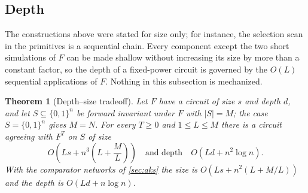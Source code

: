 \documentclass[11pt]{article}
\newtheorem{theorem}{Theorem}[section]
\theoremstyle{definition}
\theoremstyle{remark}
\newcommand{\bits}{\{0,1\}}
\numberwithin{equation}{section}
\begin{document}
\subsection{Depth}\label{sec:depth-size}

The constructions above were stated for size only; for instance, the
selection scan in the primitives is a sequential chain.  Every component
except the two short simulations of $F$ can be made shallow without
increasing its size by more than a constant factor, so the depth of a
fixed-power circuit is governed by the $O(L)$ sequential applications of
$F$.  Nothing in this subsection is mechanized.

\begin{theorem}[Depth--size tradeoff]\label{thm:depth-size}
Let $F$ have a circuit of size $s$ and depth $d$, and let
$S\subseteq\bits^n$ be forward invariant under $F$ with $|S|=M$; the
case $S=\bits^n$ gives $M=N$.  For every $T\geq0$ and $1\leq L\leq M$
there is a circuit agreeing with $F^T$ on $S$ of size
\[
  O\!\left(Ls+n^3\left(L+\frac ML\right)\right)
  \quad\text{and depth}\quad
  O\!\left(Ld+n^2\log n\right).
\]
With the comparator networks of \cref{sec:aks} the size is
$O(Ls+n^2(L+M/L))$ and the depth is $O(Ld+n\log n)$.
\end{theorem}
\end{document}

